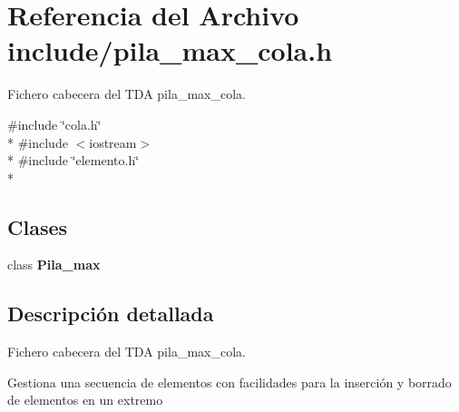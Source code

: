 \section{Referencia del Archivo include/pila\+\_\+max\+\_\+cola.h}
\label{pila__max__cola_8h}


Fichero cabecera del T\+DA pila\+\_\+max\+\_\+cola.  


{\ttfamily \#include \char`\"{}cola.\+h\char`\"{}}\\*
{\ttfamily \#include $<$iostream$>$}\\*
{\ttfamily \#include \char`\"{}elemento.\+h\char`\"{}}\\*
\subsection*{Clases}
\begin{DoxyCompactItemize}
\item 
class {\bf Pila\+\_\+max}
\end{DoxyCompactItemize}


\subsection{Descripción detallada}
Fichero cabecera del T\+DA pila\+\_\+max\+\_\+cola. 

Gestiona una secuencia de elementos con facilidades para la inserción y borrado de elementos en un extremo 